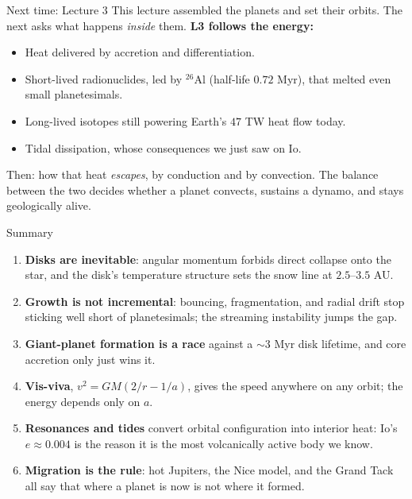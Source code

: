 \documentclass[aspectratio=169, 11pt]{beamer}
\begin{document}
\begin{frame}{Next time: Lecture 3}
  This lecture assembled the planets and set their orbits. The next asks what happens \emph{inside} them.
  \vskip6pt\relax
  \textbf{L3 follows the energy:}
  \begin{itemize}
    \item Heat delivered by accretion and differentiation.
    \item Short-lived radionuclides, led by $^{26}\mathrm{Al}$ (half-life $0.72$ Myr), that melted even small planetesimals.
    \item Long-lived isotopes still powering Earth's $47$ TW heat flow today.
    \item Tidal dissipation, whose consequences we just saw on Io.
  \end{itemize}
  \vskip6pt\relax
  Then: how that heat \emph{escapes}, by conduction and by convection. The balance between the two decides whether a planet convects, sustains a dynamo, and stays geologically alive.
\end{frame}

\begin{frame}{Summary}
  \begin{enumerate}
    \item \textbf{Disks are inevitable}: angular momentum forbids direct collapse onto the star, and the disk's temperature structure sets the snow line at $2.5$--$3.5$ AU.
    \item \textbf{Growth is not incremental}: bouncing, fragmentation, and radial drift stop sticking well short of planetesimals; the streaming instability jumps the gap.
    \item \textbf{Giant-planet formation is a race} against a $\sim 3$ Myr disk lifetime, and core accretion only just wins it.
    \item \textbf{Vis-viva}, $v^2 = GM(2/r - 1/a)$, gives the speed anywhere on any orbit; the energy depends only on $a$.
    \item \textbf{Resonances and tides} convert orbital configuration into interior heat: Io's $e \approx 0.004$ is the reason it is the most volcanically active body we know.
    \item \textbf{Migration is the rule}: hot Jupiters, the Nice model, and the Grand Tack all say that where a planet is now is not where it formed.
  \end{enumerate}
\end{frame}
\end{document}
